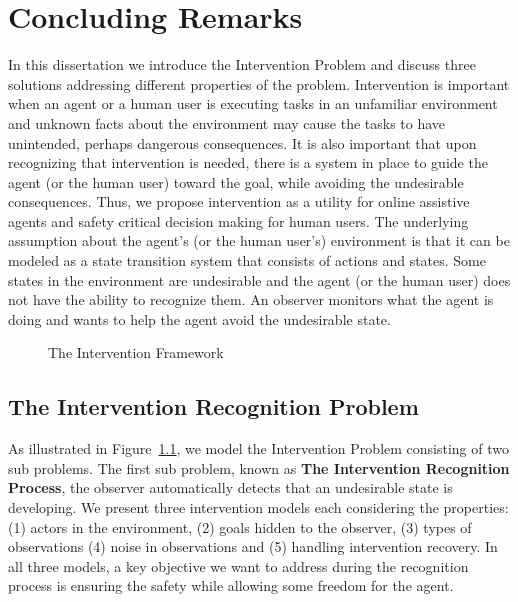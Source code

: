 \chapter{Concluding Remarks}
In this dissertation we introduce the Intervention Problem and discuss three solutions addressing different properties of the problem.
Intervention is important when an agent or a human user is executing tasks in an unfamiliar environment and unknown facts about the environment may cause the tasks to have unintended, perhaps dangerous consequences.
It is also important that upon recognizing that intervention is needed, there is a system in place to guide the agent (or the human user) toward the goal, while avoiding the undesirable consequences.
Thus, we propose intervention as a utility for online assistive agents and safety critical decision making for human users.
The underlying assumption about the agent's (or the human user's) environment is that it can be modeled as a state transition system that consists of actions and states.
Some states in the environment are undesirable and the agent (or the human user) does not have the ability to recognize them.
An observer monitors what the agent is doing and wants to help the agent avoid the undesirable state.

\begin{figure}[tpb]
   \caption{The Intervention Framework}
\label{fig:summary}
\end{figure}

\section{The Intervention Recognition Problem}
As illustrated in Figure~\ref{fig:summary}, we model the Intervention Problem consisting of two sub problems.
The first sub problem, known as \textbf{The Intervention Recognition Process}, the observer automatically detects that an undesirable state is developing.
We present three intervention models each considering the properties: (1) actors in the environment, (2) goals hidden to the observer, (3) types of observations (4) noise in observations and (5) handling intervention recovery.
In all three models, a key objective we want to address during the recognition process is ensuring the safety while allowing some freedom for the agent.

